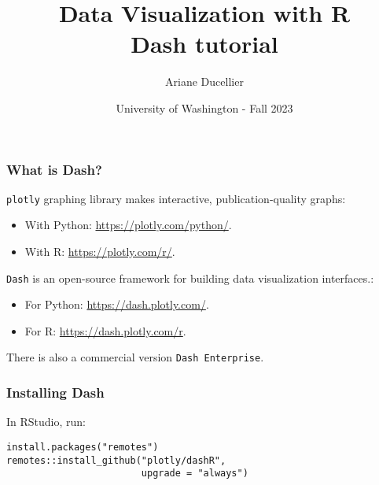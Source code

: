\documentclass{beamer}
\title[Data Visualization with R - Dash tutorial]{Data Visualization with R \\ Dash tutorial}
\author{Ariane Ducellier}
\date{University of Washington - Fall 2023}
\begin{document}
	\begin{frame}
		\titlepage
	\end{frame}

	\begin{frame}[fragile]
		\frametitle{What is Dash?}

		\verb|plotly| graphing library makes interactive, publication-quality graphs:
		\begin{itemize}
			\item With Python: \href{https://plotly.com/python/}{https://plotly.com/python/}.
			\item With R: \href{https://plotly.com/r/}{https://plotly.com/r/}.
		\end{itemize}

		\vspace{1em}

		\verb|Dash| is an open-source framework for building data visualization interfaces.:
		\begin{itemize}
			\item For Python: \href{https://dash.plotly.com/}{https://dash.plotly.com/}.
			\item For R: \href{https://dash.plotly.com/r}{https://dash.plotly.com/r}.
		\end{itemize}

		\vspace{1em}

		There is also a commercial version \verb|Dash Enterprise|.

	\end{frame}

	\begin{frame}[fragile]
		\frametitle{Installing Dash}

		In RStudio, run:

		\begin{exampleblock}{}
		\begin{BVerbatim}
install.packages("remotes")
remotes::install_github("plotly/dashR",
                        upgrade = "always")
		\end{BVerbatim}
		\end{exampleblock}{}

	\end{frame}
\end{document}

